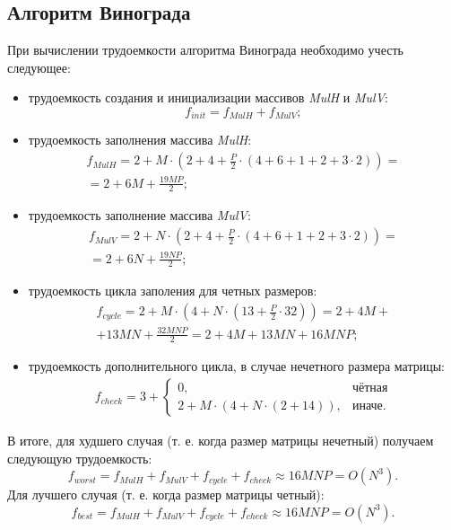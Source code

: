 \subsection*{Алгоритм Винограда}
При вычислении трудоемкости алгоритма Винограда необходимо учесть следующее:
\begin{itemize}
	\item трудоемкость создания и инициализации массивов \textit{MulH} и \textit{MulV}:
	\begin{equation}
		f_{init} = f_{MulH} + f_{MulV};
	\end{equation}
	\item трудоемкость заполнения массива \textit{MulH}:
	\begin{equation}
		\begin{gathered}
		f_{MulH} = 2 + M \cdot (2 + 4 + \frac{P}{2} \cdot (4 + 6 + 1 + 2 + 3 \cdot 2)) = \\
		= 2 + 6M + \frac{19MP}{2};
		\end{gathered}
	\end{equation}
	\item трудоемкость заполнение массива \textit{MulV}:
	\begin{equation}
		\begin{gathered}
		f_{MulV} = 2 + N \cdot (2 + 4 + \frac{P}{2} \cdot (4 + 6 + 1 + 2 + 3 \cdot 2)) = \\
		= 2 + 6N + \frac{19NP}{2};
		\end{gathered}
	\end{equation}
	\item трудоемкость цикла заполения для четных размеров:
	\begin{equation}
		\begin{gathered}
			f_{cycle} = 2 + M \cdot (4 + N \cdot (13 + \frac{P}{2} \cdot 32)) = 2 + 4M + \\
			+ 13MN + \frac{32MNP}{2}  = 2 + 4M + 13MN + 16MNP;
		\end{gathered}
	\end{equation}
	\item трудоемкость дополнительного цикла, в случае нечетного размера матрицы:
	\begin{equation}
		\begin{gathered}
			f_{check} = 3 + 
			\begin{cases}
				0, & \text{чётная} \\
				2 + M \cdot (4 + N \cdot (2 + 14)), & \text{иначе}.
			\end{cases}
		\end{gathered}  
	\end{equation}
\end{itemize}
В итоге, для худшего случая (т. е. когда размер матрицы нечетный) получаем следующую трудоемкость:
\begin{equation}
	f_{worst} = f_{MulH} + f_{MulV} + f_{cycle} + f_{check} \approx 16MNP = O(N^3).
\end{equation}
Для лучшего случая (т. е. когда размер матрицы четный):
\begin{equation}
	f_{best} = f_{MulH} + f_{MulV} + f_{cycle} + f_{check} \approx 16MNP = O(N^3).
\end{equation}

